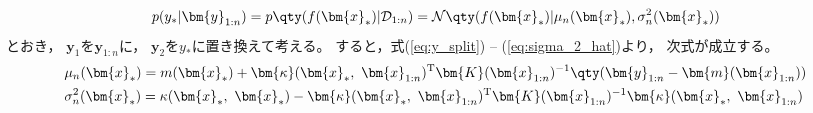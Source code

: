 \documentclass[class=jsarticle, crop=false, dvipdfmx, fleqn]{standalone}
\begin{document}
\begin{equation}
    p(y_{*} | \bm{y}_{1:n})
        = p\qty(f(\bm{x}_{*}) | \mathcal{D}_{1:n})
        = \mathcal{N}\qty(f(\bm{x}_{*}) | \mu_n (\bm{x}_{*}), \sigma_n^2 (\bm{x}_{*}))
\end{equation}
とおき，
\(\bm{y}_1\)を\(\bm{y}_{1:n}\)に，
\(\bm{y}_2\)を\(y_{*}\)に置き換えて考える。
すると，式(\ref{eq:y_split}) -- (\ref{eq:sigma_2_hat})より，
次式が成立する。
\begin{align}
    & \mu_n (\bm{x}_{*}) = m(\bm{x}_{*}) + \bm{\kappa}(\bm{x}_{*},\ \bm{x}_{1:n})^\mathrm{T} \bm{K}(\bm{x}_{1:n})^{-1} \qty(\bm{y}_{1:n} - \bm{m}(\bm{x}_{1:n})) \\
    & \sigma_n^2 (\bm{x}_{*}) = \kappa(\bm{x}_{*},\ \bm{x}_{*}) - \bm{\kappa}(\bm{x}_{*},\ \bm{x}_{1:n})^\mathrm{T} \bm{K}(\bm{x}_{1:n})^{-1} \bm{\kappa}(\bm{x}_{*},\ \bm{x}_{1:n})
\end{align}
\end{document}
